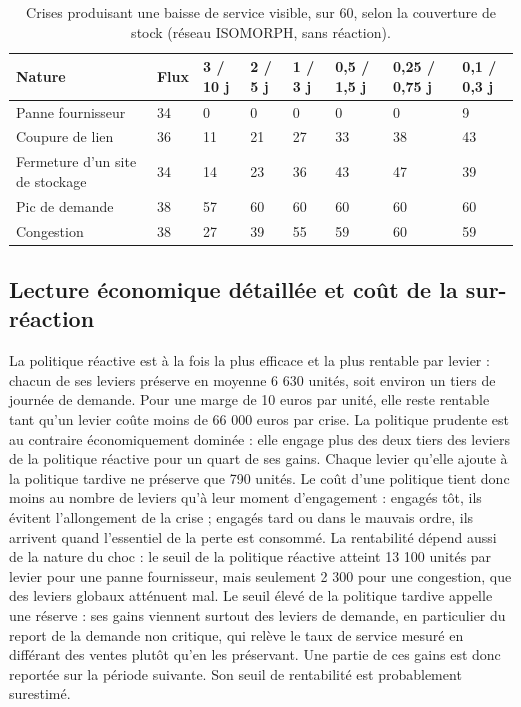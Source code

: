\begin{table}[htbp]
\caption{Crises produisant une baisse de service visible, sur 60, selon la couverture de stock (réseau ISOMORPH, sans réaction).}
\label{tab:S4}
\footnotesize
\begin{tabularx}{\textwidth}{@{}LLLLLLLL@{}}
\toprule
\textbf{Nature} & \textbf{Flux} & \textbf{3 / 10 j} & \textbf{2 / 5 j} & \textbf{1 / 3 j} & \textbf{0,5 / 1,5 j} & \textbf{0,25 / 0,75 j} & \textbf{0,1 / 0,3 j} \\
\midrule
Panne fournisseur & 34 & 0 & 0 & 0 & 0 & 0 & 9 \\
Coupure de lien & 36 & 11 & 21 & 27 & 33 & 38 & 43 \\
Fermeture d'un site de stockage & 34 & 14 & 23 & 36 & 43 & 47 & 39 \\
Pic de demande & 38 & 57 & 60 & 60 & 60 & 60 & 60 \\
Congestion & 38 & 27 & 39 & 55 & 59 & 60 & 59 \\
\bottomrule
\end{tabularx}
\end{table}

\subsection{Lecture économique détaillée et coût de la sur-réaction}
\label{sec:S6.5}

La politique réactive est à la fois la plus efficace et la plus rentable par levier : chacun de ses leviers préserve en moyenne 6 630 unités, soit environ un tiers de journée de demande. Pour une marge de 10 euros par unité, elle reste rentable tant qu'un levier coûte moins de 66 000 euros par crise. La politique prudente est au contraire économiquement dominée : elle engage plus des deux tiers des leviers de la politique réactive pour un quart de ses gains. Chaque levier qu'elle ajoute à la politique tardive ne préserve que 790 unités. Le coût d'une politique tient donc moins au nombre de leviers qu'à leur moment d'engagement : engagés tôt, ils évitent l'allongement de la crise ; engagés tard ou dans le mauvais ordre, ils arrivent quand l'essentiel de la perte est consommé. La rentabilité dépend aussi de la nature du choc : le seuil de la politique réactive atteint 13 100 unités par levier pour une panne fournisseur, mais seulement 2 300 pour une congestion, que des leviers globaux atténuent mal. Le seuil élevé de la politique tardive appelle une réserve : ses gains viennent surtout des leviers de demande, en particulier du report de la demande non critique, qui relève le taux de service mesuré en différant des ventes plutôt qu'en les préservant. Une partie de ces gains est donc reportée sur la période suivante. Son seuil de rentabilité est probablement surestimé.

